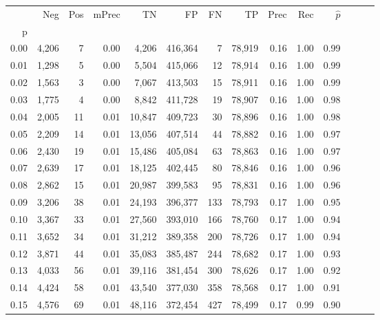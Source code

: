 \begin{tabular}{rrrrrrrrrrrrrr}
\toprule
{} &    Neg &    Pos & mPrec &       TN &       FP &      FN &      TP &  Prec &   Rec & $\hat{p}$ \\
p    &        &        &       &          &          &         &         &       &       &           \\
\midrule
0.00 &  4,206 &      7 &  0.00 &    4,206 &  416,364 &       7 &  78,919 &  0.16 &  1.00 &      0.99 \\
0.01 &  1,298 &      5 &  0.00 &    5,504 &  415,066 &      12 &  78,914 &  0.16 &  1.00 &      0.99 \\
0.02 &  1,563 &      3 &  0.00 &    7,067 &  413,503 &      15 &  78,911 &  0.16 &  1.00 &      0.99 \\
0.03 &  1,775 &      4 &  0.00 &    8,842 &  411,728 &      19 &  78,907 &  0.16 &  1.00 &      0.98 \\
0.04 &  2,005 &     11 &  0.01 &   10,847 &  409,723 &      30 &  78,896 &  0.16 &  1.00 &      0.98 \\
0.05 &  2,209 &     14 &  0.01 &   13,056 &  407,514 &      44 &  78,882 &  0.16 &  1.00 &      0.97 \\
0.06 &  2,430 &     19 &  0.01 &   15,486 &  405,084 &      63 &  78,863 &  0.16 &  1.00 &      0.97 \\
0.07 &  2,639 &     17 &  0.01 &   18,125 &  402,445 &      80 &  78,846 &  0.16 &  1.00 &      0.96 \\
0.08 &  2,862 &     15 &  0.01 &   20,987 &  399,583 &      95 &  78,831 &  0.16 &  1.00 &      0.96 \\
0.09 &  3,206 &     38 &  0.01 &   24,193 &  396,377 &     133 &  78,793 &  0.17 &  1.00 &      0.95 \\
0.10 &  3,367 &     33 &  0.01 &   27,560 &  393,010 &     166 &  78,760 &  0.17 &  1.00 &      0.94 \\
0.11 &  3,652 &     34 &  0.01 &   31,212 &  389,358 &     200 &  78,726 &  0.17 &  1.00 &      0.94 \\
0.12 &  3,871 &     44 &  0.01 &   35,083 &  385,487 &     244 &  78,682 &  0.17 &  1.00 &      0.93 \\
0.13 &  4,033 &     56 &  0.01 &   39,116 &  381,454 &     300 &  78,626 &  0.17 &  1.00 &      0.92 \\
0.14 &  4,424 &     58 &  0.01 &   43,540 &  377,030 &     358 &  78,568 &  0.17 &  1.00 &      0.91 \\
0.15 &  4,576 &     69 &  0.01 &   48,116 &  372,454 &     427 &  78,499 &  0.17 &  0.99 &      0.90 \\

\end{tabular}
